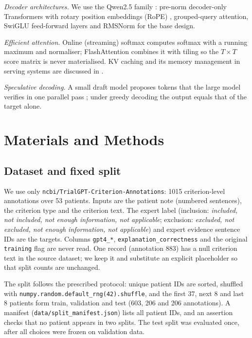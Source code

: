 \documentclass[conference]{IEEEtran}
\begin{document}
\textit{Decoder architectures.} We use the Qwen2.5 family \cite{qwen25}: pre-norm decoder-only Transformers with rotary position embeddings (RoPE) \cite{su2021roformer}, grouped-query attention, SwiGLU feed-forward layers and RMSNorm \cite{vaswani2017attention} for the base design.

\textit{Efficient attention.} Online (streaming) softmax \cite{milakov2018online} computes softmax with a running maximum and normaliser; FlashAttention \cite{dao2022flashattention} combines it with tiling so the $T\times T$ score matrix is never materialised. KV caching and its memory management in serving systems are discussed in \cite{kwon2023pagedattention}.

\textit{Speculative decoding.} A small draft model proposes tokens that the large model verifies in one parallel pass \cite{leviathan2023speculative,chen2023accelerating}; under greedy decoding the output equals that of the target alone.

\section{Materials and Methods}
\subsection{Dataset and fixed split}
We use only \texttt{ncbi/TrialGPT-Criterion-Annotations}: 1015 criterion-level annotations over 53 patients. Inputs are the patient note (numbered sentences), the criterion type and the criterion text. The expert label (inclusion: \emph{included, not included, not enough information, not applicable}; exclusion: \emph{excluded, not excluded, not enough information, not applicable}) and expert evidence sentence IDs are the targets. Columns \texttt{gpt4\_*}, \texttt{explanation\_correctness} and the original \texttt{training} flag are never read. One record (annotation 883) has a null criterion text in the source dataset; we keep it and substitute an explicit placeholder so that split counts are unchanged.

The split follows the prescribed protocol: unique patient IDs are sorted, shuffled with \texttt{numpy.random.default\_rng(42).shuffle}, and the first 37, next 8 and last 8 patients form train, validation and test (603, 206 and 206 annotations). A manifest (\texttt{data/split\_manifest.json}) lists all patient IDs, and an assertion checks that no patient appears in two splits. The test split was evaluated once, after all choices were frozen on validation data.
\end{document}
